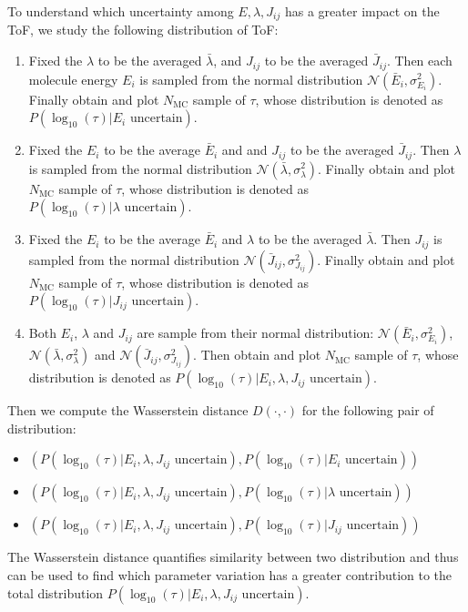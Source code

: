 \documentclass[letterpaper,12pt]{article}
\begin{document}
To understand which uncertainty among $E, \lambda, J_{ij}$ has a greater impact on the ToF, we study the following distribution of ToF:
\begin{enumerate}
    \item Fixed the $\lambda$ to be the averaged $\bar{\lambda}$, and $J_{ij}$ to be the averaged $\bar{J}_{ij}$. Then each molecule energy $E_i$ is sampled from the normal distribution $\mathcal{N}(\bar{E}_i, \sigma^2_{E_i})$. Finally obtain and plot $N_\text{MC}$ sample of $\tau$, whose distribution is denoted as $P(\log_{10}(\tau)|E_i \text{ uncertain})$.
    \item Fixed the $E_i$ to be the average $\bar{E}_i$ and and $J_{ij}$ to be the averaged $\bar{J}_{ij}$. Then $\lambda$ is sampled from the normal distribution $\mathcal{N}(\bar{\lambda}, \sigma^2_{\lambda})$. Finally obtain and plot $N_\text{MC}$ sample of $\tau$, whose distribution is denoted as $P(\log_{10}(\tau)|\lambda \text{ uncertain})$. 
    \item Fixed the $E_i$ to be the average $\bar{E}_i$ and $\lambda$ to be the averaged $\bar{\lambda}$. Then $J_{ij}$ is sampled from the normal distribution $\mathcal{N}(\bar{J}_{ij}, \sigma^2_{J_{ij}})$. Finally obtain and plot $N_\text{MC}$ sample of $\tau$, whose distribution is denoted as $P(\log_{10}(\tau)|J_{ij} \text{ uncertain})$.
    \item Both $E_i$, $\lambda$ and $J_{ij}$ are sample from their normal distribution: $\mathcal{N}(\bar{E}_i, \sigma^2_{E_i})$, $\mathcal{N}(\bar{\lambda}, \sigma^2_{\lambda})$ and $\mathcal{N}(\bar{J}_{ij}, \sigma^2_{J_{ij}})$. Then obtain and plot $N_\text{MC}$ sample of $\tau$, whose distribution is denoted as $P(\log_{10}(\tau)|E_i, \lambda, J_{ij} \text{ uncertain})$.
\end{enumerate}

Then we compute the Wasserstein distance $D(\cdot, \cdot)$ for the following pair of distribution: 
\begin{itemize}
    \item $(P(\log_{10}(\tau)|E_i, \lambda, J_{ij} \text{ uncertain}),P(\log_{10}(\tau)|E_i \text{ uncertain}))$
    \item $(P(\log_{10}(\tau)|E_i, \lambda, J_{ij} \text{ uncertain}),P(\log_{10}(\tau)|\lambda \text{ uncertain}))$
    \item $(P(\log_{10}(\tau)|E_i, \lambda, J_{ij} \text{ uncertain}),P(\log_{10}(\tau)|J_{ij} \text{ uncertain}))$
\end{itemize}
The Wasserstein distance quantifies similarity between two distribution and thus can be used to find which parameter variation has a greater contribution to the total distribution $P(\log_{10}(\tau)|E_i, \lambda, J_{ij} \text{ uncertain})$.
\end{document}
